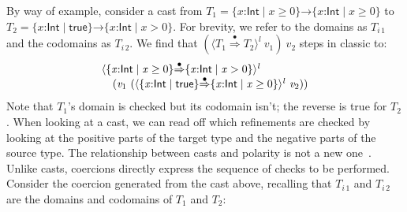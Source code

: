 \documentclass[9pt]{extarticle}
\newcommand{\ottnt}[1]{\mathit{#1}}
\newcommand{\ottmv}[1]{\mathit{#1}}
\newcommand{\ottsym}[1]{#1}
\begin{document}
By way of example, consider a cast from $\ottnt{T_{{\mathrm{1}}}}  \ottsym{=}    \{ \mathit{x} \mathord{:}  \mathsf{Int}  \mathrel{\mid}  \mathit{x}  \mathrel{\ge}  \ottsym{0}  \}  \mathord{ \rightarrow }  \{ \mathit{x} \mathord{:}  \mathsf{Int}  \mathrel{\mid}  \mathit{x}  \mathrel{\ge}  \ottsym{0}  \}  $ to $\ottnt{T_{{\mathrm{2}}}}  \ottsym{=}    \{ \mathit{x} \mathord{:}  \mathsf{Int}  \mathrel{\mid}  \mathsf{true}  \}  \mathord{ \rightarrow }  \{ \mathit{x} \mathord{:}  \mathsf{Int}  \mathrel{\mid}  \mathit{x}  \mathrel{>} \ottsym{0}  \}  $. 
For brevity, we refer to the domains as $\ottnt{T_{\ottmv{i}\,{\mathrm{1}}}}$ and the codomains as $\ottnt{T_{\ottmv{i}\,{\mathrm{2}}}}$.
We find that $  (  \langle  \ottnt{T_{{\mathrm{1}}}}  \mathord{ \overset{\bullet}{\Rightarrow} }  \ottnt{T_{{\mathrm{2}}}}  \rangle^{ \ottnt{l} } ~  \mathit{v_{{\mathrm{1}}}}  )  ~ \mathit{v_{{\mathrm{2}}}} $ steps in classic \lambdah to:
\[ \begin{array}{@{}l@{}} 
   \langle   \{ \mathit{x} \mathord{:}  \mathsf{Int}  \mathrel{\mid}  \mathit{x}  \mathrel{\ge}  \ottsym{0}  \}   \mathord{ \overset{\bullet}{\Rightarrow} }   \{ \mathit{x} \mathord{:}  \mathsf{Int}  \mathrel{\mid}  \mathit{x}  \mathrel{>} \ottsym{0}  \}   \rangle^{ \ottnt{l} } ~  {} \\  \quad   (  \mathit{v_{{\mathrm{1}}}} ~  (  \langle   \{ \mathit{x} \mathord{:}  \mathsf{Int}  \mathrel{\mid}  \mathsf{true}  \}   \mathord{ \overset{\bullet}{\Rightarrow} }   \{ \mathit{x} \mathord{:}  \mathsf{Int}  \mathrel{\mid}  \mathit{x}  \mathrel{\ge}  \ottsym{0}  \}   \rangle^{ \ottnt{l} } ~  \mathit{v_{{\mathrm{2}}}}  )   )  
\end{array} \]
Note that $\ottnt{T_{{\mathrm{1}}}}$'s domain is checked but its codomain isn't; the
reverse is true for $\ottnt{T_{{\mathrm{2}}}}$. When looking at a cast, we can read off
which refinements are checked by looking at the positive parts of the
target type and the negative parts of the source type. The
relationship between casts and polarity is not a new
one~\cite{Findler06projections,Gronski07unifying,Herman07space,Wadler09blame,Greenberg13thesis}.
Unlike casts, coercions directly express the sequence of checks to be
performed. Consider the coercion generated from the cast above,
recalling that $\ottnt{T_{\ottmv{i}\,{\mathrm{1}}}}$ and $\ottnt{T_{\ottmv{i}\,{\mathrm{2}}}}$ are the domains and codomains
of $\ottnt{T_{{\mathrm{1}}}}$ and $\ottnt{T_{{\mathrm{2}}}}$:
\end{document}
